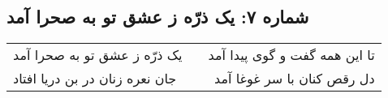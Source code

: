 \begin{center}
\section*{شماره ۷: یک ذرّه ز عشق تو به صحرا آمد}
\label{sec:007}
\begin{longtable}{l p{0.5cm} r}
یک ذرّه ز عشق تو به صحرا آمد
&&
تا این همه گفت و گوی پیدا آمد
\\
جان نعره زنان در بن دریا افتاد
&&
دل رقص کنان با سر غوغا آمد
\\
\end{longtable}
\end{center}
